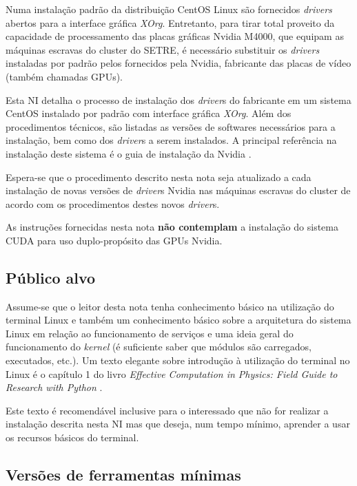 \documentclass[twoside,a4paper,12pt,english]{inac17}
\begin{document}
Numa instalação padrão da distribuição CentOS Linux são fornecidos \textit{drivers} 
abertos para a interface gráfica \textit{XOrg}. Entretanto, para tirar total proveito 
da capacidade de processamento das placas gráficas Nvidia M4000, 
que equipam as máquinas escravas do cluster do SETRE, é necessário 
substituir os \textit{drivers} instaladas por padrão pelos fornecidos pela 
Nvidia, fabricante das placas de vídeo (também chamadas GPUs). 

Esta NI detalha o processo de instalação dos \textit{driver}s do fabricante 
em um sistema CentOS instalado por padrão com interface gráfica \textit{XOrg}. 
Além dos procedimentos técnicos, são listadas as versões de softwares 
necessários para a instalação, bem como dos \textit{driver}s a serem instalados. A principal referência na instalação deste sistema 
é o guia de instalação da Nvidia \cite{inst-nvidia}.

Espera-se que o procedimento descrito nesta nota seja atualizado 
a cada instalação de novas versões de \textit{driver}s Nvidia nas máquinas 
escravas do cluster de acordo com os procedimentos destes novos 
\textit{driver}s.

As instruções fornecidas nesta nota \textbf{não contemplam} a 
instalação do sistema CUDA para uso duplo-propósito das GPUs 
Nvidia.

\subsection{Público alvo}

Assume-se que o leitor desta nota tenha conhecimento básico na utilização do 
terminal Linux e também um conhecimento básico sobre a arquitetura do sistema 
Linux em relação ao funcionamento de serviços e uma ideia geral do funcionamento 
do \textit{kernel} (é suficiente saber que módulos são carregados, executados, etc.).
Um texto elegante sobre introdução à utilização do terminal no Linux é o capítulo 
1 do livro \textit{Effective Computation in Physics: Field Guide to Research with Python} \cite{Scopatz2015}.

Este texto é recomendável inclusive para o interessado que não for realizar a instalação descrita nesta NI mas que deseja, num tempo mínimo, aprender a usar 
os recursos básicos do terminal.

\subsection{Versões de ferramentas mínimas}
\end{document}
